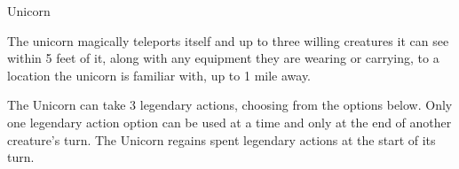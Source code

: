 \begin{DndMonster}[float*=htb,width=\textwidth + 8pt]{Unicorn}
\begin{multicols}{2}
The unicorn magically teleports itself and up to three willing creatures it can see within 5 feet of it, along with any equipment they are wearing or carrying, to a location the unicorn is familiar with, up to 1 mile away.


The Unicorn can take 3 legendary actions, choosing from the options below. Only one legendary action option can be used at a time and only at the end of another creature's turn. The Unicorn regains spent legendary actions at the start of its turn.

\begin{DndMonsterLegendaryActions}
\end{DndMonsterLegendaryActions}
\end{multicols}
\end{DndMonster}